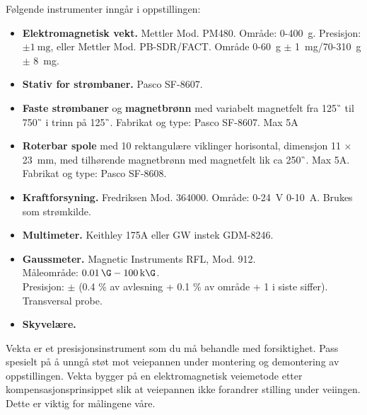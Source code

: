 \documentclass[../Elmag-labhefte-2020.tex]{subfiles}
\begin{document}
Følgende instrumenter inngår i oppstillingen:
\vspace{-4mm} 
\begin{itemize}
    \item \textbf{Elektromagnetisk vekt.} Mettler Mod. PM480.  Område: 0-\SI{400}{\g}. Presisjon: $\pm \SI{1}{\milli\g}$, eller Mettler Mod. PB-SDR/FACT. Område 0-\SI{60}{\g} $\pm$ \SI{1}{\milli\g}/70-\SI{310}{\g} $\pm$ \SI{8}{\milli\g}.
    \item \textbf{Stativ for strømbaner.} Pasco SF-8607. 
    \item \textbf{Faste strømbaner} og \textbf{magnetbrønn} med variabelt magnetfelt fra \SI{125}{\G} til \SI{750}{\G} i trinn på \SI{125}{\G}.  Fabrikat og type: Pasco SF-8607. Max 5A
    \item \textbf{Roterbar spole} med 10 rektangulære viklinger horisontal, dimensjon 11 $\times$ \SI{23}{\mm},  med tilhørende magnetbrønn med magnetfelt lik ca \SI{250}{\G}.  Max 5A.
    Fabrikat og type: Pasco SF-8608.
    \item \textbf{Kraftforsyning.} Fredriksen Mod. 364000. Område: 0-\SI{24}{\volt} 0-\SI{10}{\ampere}. Brukes som strømkilde.
    \item \textbf{Multimeter.} Keithley 175A eller GW instek GDM-8246.
    \item \textbf{Gaussmeter.} Magnetic Instruments RFL, Mod. 912. \\
    Måleområde: \(\SI{0.01}{\G}-\SI{100}{\kilo\G}\). \\
    Presisjon: \(\pm\) (0.4 \% av avlesning + 0.1 \% av område + 1 i siste siffer). \\
    Transversal probe.
    \item \textbf{Skyvelære.}
\end{itemize}

Vekta er et presisjonsinstrument som du må behandle med forsiktighet. Pass spesielt på å unngå støt mot veiepannen under montering og demontering av oppstillingen.  Vekta bygger på en elektromagnetisk veiemetode etter kompensasjonsprinsippet slik at veiepannen ikke forandrer stilling under veiingen. Dette er viktig for målingene våre.

\end{document}
